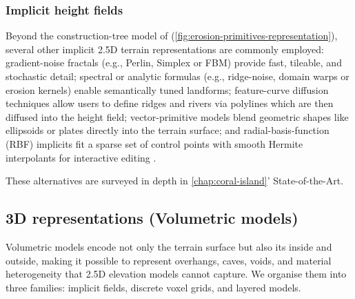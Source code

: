 \subsubsection{Implicit height fields}

Beyond the construction-tree model of \cite{Genevaux2015} (\cref{fig:erosion-primitives-representation}), several other implicit 2.5D terrain representations are commonly employed: gradient-noise fractals (e.g., Perlin, Simplex or FBM) provide fast, tileable, and stochastic detail; spectral or analytic formulas (e.g., ridge-noise, domain warps or erosion kernels) enable semantically tuned landforms; feature-curve diffusion techniques allow users to define ridges and rivers via polylines which are then diffused into the height field; vector-primitive models blend geometric shapes like ellipsoids or plates directly into the terrain surface; and radial-basis-function (RBF) implicits fit a sparse set of control points with smooth Hermite interpolants for interactive editing .

These alternatives are surveyed in depth in \cref{chap:coral-island}' State-of-the-Art.

\subsection{3D representations (Volumetric models)}
Volumetric models encode not only the terrain surface but also its inside and outside, making it possible to represent overhangs, caves, voids, and material heterogeneity that 2.5D elevation models cannot capture.
We organise them into three families: implicit fields, discrete voxel grids, and layered models.


